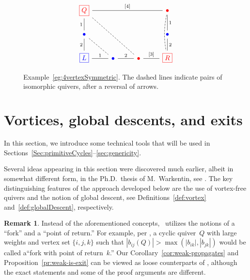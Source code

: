 \documentclass[11pt, letterpaper]{amsart}
\theoremstyle{definition}
\newtheorem{remark}[theorem]{Remark}
\numberwithin{equation}{section}
\newcommand{\red}[1]{{\color{red} #1}}
\newcommand{\blue}[1]{{\color{blue} #1}}
\newcommand{\T}[2]{\mu[#1](#2)} %
\begin{document}
\begin{figure}[ht]
\vspace{-.1in}
\begin{equation*}
\begin{tikzcd}[arrows={-stealth, cramped}
]
\red{\boxed{Q}}  \arrow[rrr, no head, "{[4]}"] \arrow[d, swap, no head, "1"] \ar[ddrr, dashed, no head]
  &&& \red{\bullet} \arrow[d, no head, "1"] \ar[dd, dashed, no head, bend right=10pt]\\
\blue{\bullet} \arrow[d, swap, no head,"2"]  \ar[dr, dashed, no head] &&&  \blue{\bullet} \arrow[d, no head,"2"]  \\
\blue{\boxed{L}} \arrow[r, no head, "1"] & \blue{\bullet} \arrow[r, no head, "2" ] 
    & \red{\bullet} \arrow[r, no head,"{[3]}"] & \red{\boxed{R}}
\end{tikzcd} 
\end{equation*}

\vspace{-.15in}
\caption{
Example~\ref{eg:4vertexSymmetric}. 
The dashed lines indicate pairs of isomorphic quivers, after a reversal of arrows. 
}%
\label{fig:cycleCollapse}
\vspace{-.2in}
\end{figure}

\newpage

\section{Vortices, global descents, and exits}
\label{sec:exits}

In this section, we introduce some technical tools that will be used in Sections~\ref{Sec:primitiveCycles}--\ref{sec:genericity}. 

Several ideas appearing in this section were discovered much earlier, albeit in somewhat different form, 
in the Ph.D.\ thesis of M.~Warkentin, 
see \cite[pages 13--18]{Warkentin}. \linebreak[3]
The key distinguishing features of the approach developed below are the use of vortex-free quivers 
and the notion of global descent, see Definitions~\ref{def:vortex} and~\ref{def:globalDescent}, respectively. 

\begin{remark}
Instead of the aforementioned concepts, \cite{Warkentin}~utilizes the notions of a ``fork'' and a ``point of return.''
For example, per \cite[Definition~2.1]{Warkentin}, 
a cyclic quiver~$Q$ with large weights and vertex set $\{i,j,k\}$ 
such that $|b_{ij}(Q)|>\max(|b_{ik}|,|b_{jk}|)$ 
would be called a``fork with point of return~$k$.''
Our Corollary~\ref{cor:weak-propagates} and Proposition~\ref{pr:weak-is-exit}
can be viewed as loose counterparts of \cite[Lemmas 2.5, 2.8, 3.5]{Warkentin},
although the exact statements and some of the proof arguments are different. 
\end{remark}
\end{document}
